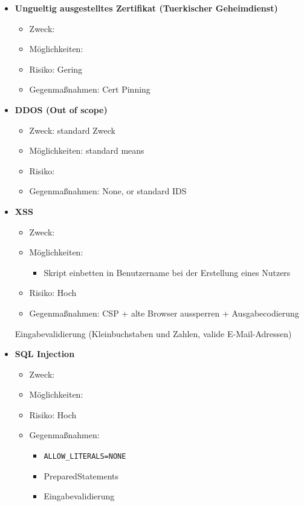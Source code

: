 \documentclass[12pt,DIV14,BCOR10mm,a4paper,twoside,parskip=half-,headsepline,headinclude,english,ngerman,bibliography=totocnumbered]{scrreprt}
\begin{document}
\begin{itemize}
  \item \textbf{Ungueltig ausgestelltes Zertifikat (Tuerkischer Geheimdienst)}
  \begin{itemize}
  \item Zweck:
  \item Möglichkeiten:
  \item Risiko: Gering
  \item Gegenmaßnahmen: Cert Pinning
  \end{itemize}

  \item \textbf{DDOS (Out of scope)}
  \begin{itemize}
  \item Zweck: standard Zweck
  \item Möglichkeiten: standard means
  \item Risiko:
  \item Gegenmaßnahmen: None, or standard IDS
  \end{itemize}

  \item \textbf{XSS}
  \begin{itemize}
  \item Zweck:
  \item Möglichkeiten:
  \begin{itemize}
          \item Skript einbetten in Benutzername bei der Erstellung eines Nutzers
      \end{itemize}
  \item Risiko: Hoch
  \item Gegenmaßnahmen: CSP + alte Browser aussperren + Ausgabecodierung
  \end{itemize}
      Eingabevalidierung (Kleinbuchstaben und Zahlen, valide E-Mail-Adressen)

  \item \textbf{SQL Injection}
  \begin{itemize}
  \item Zweck:
  \item Möglichkeiten:
  \item Risiko: Hoch
  \item Gegenmaßnahmen:
  \begin{itemize}
    \item \texttt{ALLOW\_LITERALS=NONE}
    \item PreparedStatements
    \item Eingabevalidierung
  \end{itemize}
  \end{itemize}


\end{itemize}
\end{document}
